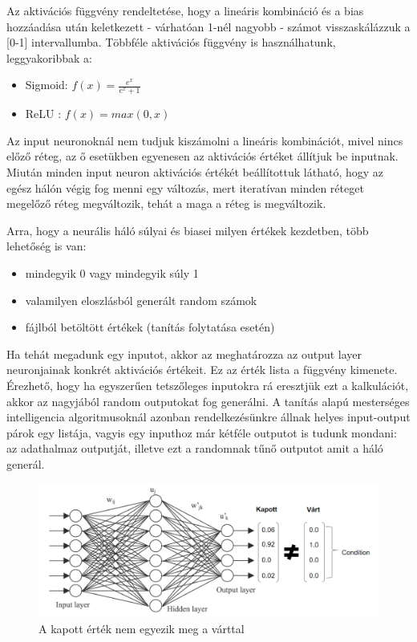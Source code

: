 \documentclass[12pt]{article}
\begin{document}
Az aktivációs függvény rendeltetése, hogy a lineáris kombináció és a bias hozzáadása után keletkezett - várhatóan 1-nél nagyobb - számot visszaskálázzuk a [0-1] intervallumba.
Többféle aktivációs függvény is használhatunk, leggyakoribbak a:

\begin{itemize}  
	\item Sigmoid: $f(x) = \frac{e^x}{e^x+1}$ 
	\item ReLU : $f(x) = max(0,x)$
\end{itemize}

Az input neuronoknál nem tudjuk kiszámolni a lineáris kombinációt, mivel nincs előző réteg, az ő esetükben egyenesen az aktivációs értéket állítjuk be inputnak. Miután minden input neuron aktivációs értékét beállítottuk látható, hogy az egész hálón végig fog menni egy változás, mert iteratívan minden réteget megelőző réteg megváltozik, tehát a maga a réteg is megváltozik.

Arra, hogy a neurális háló súlyai és biasei milyen értékek kezdetben, több lehetőség is van:
\begin{itemize}  
	\item mindegyik 0 vagy mindegyik súly 1
	\item valamilyen eloszlásból generált random számok
	\item fájlból betöltött értékek (tanítás folytatása esetén)
\end{itemize}

Ha tehát megadunk egy inputot, akkor az meghatározza az output layer neuronjainak konkrét aktivációs értékeit. Ez az érték lista a függvény kimenete. Érezhető, hogy ha egyszerűen tetszőleges inputokra rá eresztjük ezt a kalkulációt, akkor az nagyjából random outputokat fog generálni. A tanítás alapú mesterséges intelligencia algoritmusoknál azonban rendelkezésünkre állnak helyes input-output párok egy listája, vagyis egy inputhoz már kétféle outputot is tudunk mondani: az adathalmaz outputját, illetve ezt a randomnak tűnő outputot amit a háló generál.

\begin{figure}[h!]
  \includegraphics[width=\linewidth]{kapott_vart.png}
  \caption{A kapott érték nem egyezik meg a várttal}
\end{figure}
\end{document}
